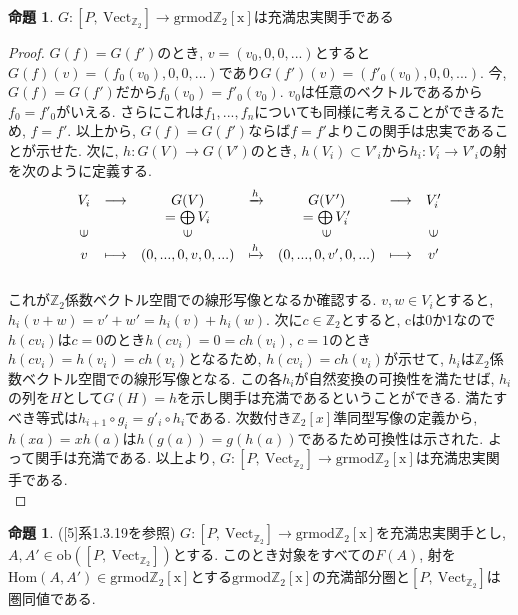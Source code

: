 \documentclass[a4paper]{jsarticle}
\theoremstyle{definition}
\newtheorem{prop}[dfn]{命題}
\newcommand{\Fun}[2]{[#1,~#2]}
\newcommand{\Vect}{{\mathrm{Vect}}}
\newcommand{\grmodZ}{{\mathrm{grmod \mathbb{Z}_2[x]}}}
\newcommand{\Hom}{{\mathrm{Hom}}}
\newcommand{\ob}{{\mathrm{ob}}}
\begin{document}
 
\begin{prop}
    $G:\Fun{P}{\Vect_{\mathbb{Z}_2}}\rightarrow \grmodZ$は充満忠実関手である
\end{prop}
\begin{proof}
 $G(f)=G(f')$のとき, $v=(v_0,0,0,...)$とすると$G(f)(v)=(f_0(v_0),0,0,...)$であり$G(f')(v)=(f'_0(v_0),0,0,...)$. 今, $G(f)=G(f')$だから$f_0(v_0)=f'_0(v_0)$. $v_0$は任意のベクトルであるから$f_0=f'_0$がいえる. さらにこれは$f_1,...,f_n$についても同様に考えることができるため, $f=f'$. 以上から, $G(f)=G(f')$ならば$f=f'$よりこの関手は忠実であることが示せた. 次に, $h:G(V)\rightarrow G(V')$のとき, $h(V_i)\subset V'_i$から$h_i:V_i\rightarrow V'_i$の射を次のように定義する.
\begin{equation}
    \begin{array}{ccccccc}
         V_i&\longrightarrow& G(V) & \xrightarrow[]{h} & G(V')& \longrightarrow&V'_i\\
         &              &  =\bigoplus V_i &             &    =\bigoplus V'_i     & &\\
       \rotatebox{90}{$\in$} & &\rotatebox{90}{$\in$} & & \rotatebox{90}{$\in$} & & \rotatebox{90}{$\in$}\\
        v& \longmapsto & (0,...,0,v,0,...) &\xmapsto{h} & (0,...,0,v',0,...)& \longmapsto & v'\\\notag
    \end{array}
\end{equation}
これが$\mathbb{Z}_2$係数ベクトル空間での線形写像となるか確認する. $v, w\in V_i$とすると, 
$h_i(v+w)=v'+w'=h_i(v)+h_i(w)$. 次に$c\in\mathbb{Z}_2$とすると, cは0か1なので$h(cv_i)$は$c=0$のとき$h(cv_i)=0=ch(v_i)$, $c=1$のとき$h(cv_i)=h(v_i)=ch(v_i)$となるため, $h(cv_i)=ch(v_i)$が示せて, $h_i$は$\mathbb{Z}_2$係数ベクトル空間での線形写像となる. この各$h_i$が自然変換の可換性を満たせば, $h_i$の列を$H$として$G(H)=h$を示し関手は充満であるということができる. 満たすべき等式は$h_{i+1}\circ g_i=g'_i\circ h_{i}$である. 次数付き$\mathbb{Z}_2[x]$準同型写像の定義から, $h(xa)=xh(a)$は$h(g(a))=g(h(a))$であるため可換性は示された. よって関手は充満である. 以上より, $G:\Fun{P}{\Vect_{\mathbb{Z}_2}}\rightarrow \grmodZ$は充満忠実関手である.\\
\end{proof}
\begin{prop}([5]系1.3.19を参照)
    $G:\Fun{P}{\Vect_{\mathbb{Z}_2}}\rightarrow \grmodZ$を充満忠実関手とし, $A, A'\in \ob(\Fun{P}{\Vect_{\mathbb{Z}_2}})$とする. このとき対象をすべての$F(A)$, 射を$\Hom(A,A')\in\grmodZ$とする$\grmodZ$の充満部分圏と$\Fun{P}{\Vect_{\mathbb{Z}_2}}$は圏同値である. 
\end{prop}
\end{document}
